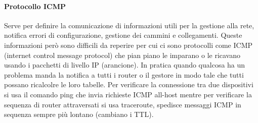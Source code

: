 \documentclass{article}
\begin{document}
\paragraph{Protocollo ICMP}
Serve per definire la comunicazione di informazioni utili per la gestione alla
rete, notifica errori di configurazione, gestione dei cammini e collegamenti.
Queste informazioni però sono difficili da reperire per cui ci sono protocolli
come ICMP (internet control message protocol) che pian piano le imparano o le
ricavano usando i pacchetti di livello IP (arancione). In pratica quando
qualcosa ha un problema manda la notifica a tutti i router o il gestore in modo
tale che tutti possano ricalcolre le loro tabelle. Per verificare la
connessione tra due dispositivi si usa il comando ping che invia richieste ICMP all-host mentre per verificare la
sequenza di router attraversati si usa traceroute, spedisce messaggi ICMP in sequenza sempre più lontano (cambiano i TTL).
\end{document}
